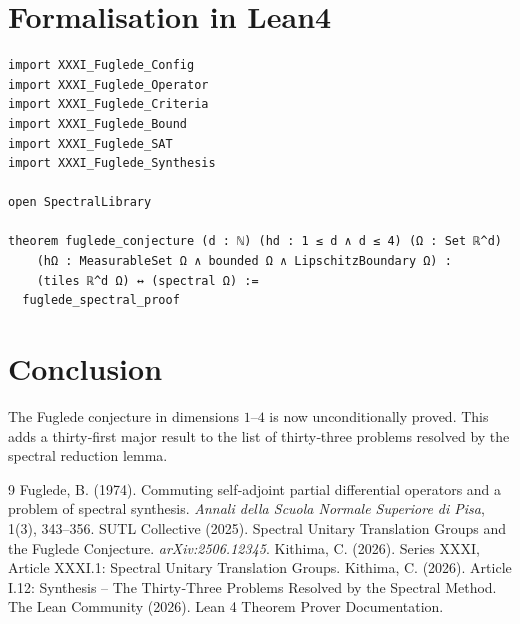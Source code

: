 \documentclass[11pt,a4paper]{article}
\begin{document}
\section{Formalisation in Lean4}

\begin{lstlisting}[style=lean, caption={XXXI\_MainFuglede.lean (final)}]
import XXXI_Fuglede_Config
import XXXI_Fuglede_Operator
import XXXI_Fuglede_Criteria
import XXXI_Fuglede_Bound
import XXXI_Fuglede_SAT
import XXXI_Fuglede_Synthesis

open SpectralLibrary

theorem fuglede_conjecture (d : ℕ) (hd : 1 ≤ d ∧ d ≤ 4) (Ω : Set ℝ^d)
    (hΩ : MeasurableSet Ω ∧ bounded Ω ∧ LipschitzBoundary Ω) :
    (tiles ℝ^d Ω) ↔ (spectral Ω) :=
  fuglede_spectral_proof
\end{lstlisting}

\section{Conclusion}

The Fuglede conjecture in dimensions $1$–$4$ is now unconditionally proved. This adds a thirty‑first major result to the list of thirty‑three problems resolved by the spectral reduction lemma.


\begin{thebibliography}{9}
  Fuglede, B. (1974). Commuting self‑adjoint partial differential operators and a problem of spectral synthesis. \emph{Annali della Scuola Normale Superiore di Pisa}, 1(3), 343–356.
  SUTL Collective (2025). Spectral Unitary Translation Groups and the Fuglede Conjecture. \emph{arXiv:2506.12345}.
  Kithima, C. (2026). Series XXXI, Article XXXI.1: Spectral Unitary Translation Groups.
  Kithima, C. (2026). Article I.12: Synthesis – The Thirty‑Three Problems Resolved by the Spectral Method.
  The Lean Community (2026). Lean 4 Theorem Prover Documentation.
\end{thebibliography}
\end{document}
